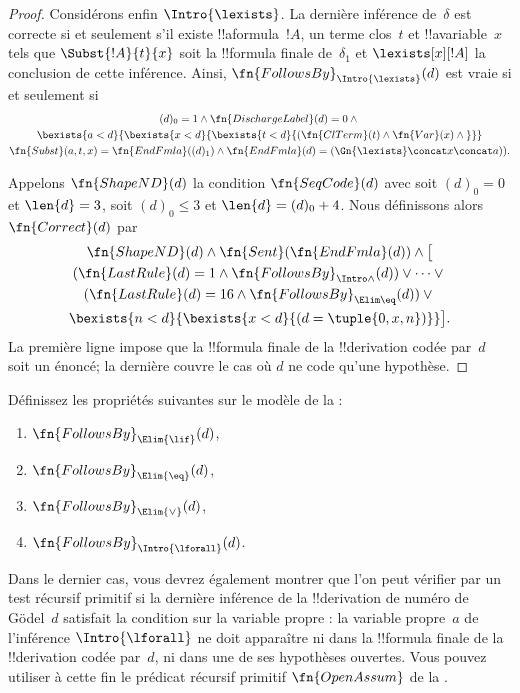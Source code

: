 \documentclass[../../../include/open-logic-section]{subfiles}
\begin{document}
\begin{proof}
  Considérons enfin $\Intro{\lexists}$. La dernière inférence
  de~$\delta$ est correcte si et seulement s'il existe !!a{formula}~$!A$,
  un terme clos~$t$ et !!a{variable}~$x$ tels que
  $\Subst{!A}{t}{x}$ soit la !!{formula} finale de~$\delta_1$
  et $\lexists[x][!A]$ la conclusion de cette inférence. Ainsi,
  $\fn{FollowsBy}_{\Intro{\lexists}}(d)$ est vraie si et seulement si
  \begin{multline*}
    (d)_0 = 1 \land \fn{DischargeLabel}(d) = 0 \land {} \\
    \bexists{a < d}{\bexists{x<d}{\bexists{t<d}{
          (\fn{ClTerm}(t) \land \fn{Var}(x)  \land {}}}}\\
    \fn{Subst}(a,t,x) = \fn{EndFmla}((d)_1) \land
    \fn{EndFmla}(d) = (\Gn{\lexists} \concat x \concat a)).
  \end{multline*}

  Appelons $\fn{ShapeND}(d)$ la condition $\fn{SeqCode}(d)$ avec soit $(d)_0=0$ et $\len{d}=3$, soit $(d)_0\leq3$ et $\len{d}=(d)_0+4$. Nous définissons alors $\fn{Correct}(d)$ par
  \begin{multline*}
    \fn{ShapeND}(d)\land\fn{Sent}(\fn{EndFmla}(d)) \land \bigl[{}\\
    (\fn{LastRule}(d) = 1 \land
    \fn{FollowsBy}_{\Intro\land}(d)) \lor \dots \lor {}\\
    (\fn{LastRule}(d) = 16 \land \fn{FollowsBy}_{\Elim\eq}(d)) \lor {}\\
    \bexists{n<d}{\bexists{x<d}{(d = \tuple{0, x, n})}}\bigr].
  \end{multline*}
  La première ligne impose que la !!{formula} finale de la
  !!{derivation} codée par~$d$ soit
  un énoncé; la dernière couvre le cas où $d$ ne code qu'une
  hypothèse.
\end{proof}

\begin{prob}
  Définissez les propriétés suivantes sur le modèle de la
   :
  \begin{enumerate}
  \item $\fn{FollowsBy}_{\Elim{\lif}}(d)$,
  \item $\fn{FollowsBy}_{\Elim{\eq}}(d)$,
  \item $\fn{FollowsBy}_{\Elim{\lor}}(d)$,
  \item $\fn{FollowsBy}_{\Intro{\lforall}}(d)$.
  \end{enumerate}
  Dans le dernier cas, vous devrez également montrer que l'on peut
  vérifier par un test récursif primitif si la dernière inférence de
  la !!{derivation} de numéro de G\"odel~$d$ satisfait la condition
  sur la variable propre : la variable propre~$a$ de l'inférence
  $\Intro{\lforall}$ ne doit apparaître ni dans la !!{formula}
  finale de la !!{derivation} codée par~$d$, ni dans une de ses
  hypothèses ouvertes. Vous pouvez
  utiliser à cette fin le prédicat récursif primitif
  $\fn{OpenAssum}$ de la .
\end{prob}
\end{document}
